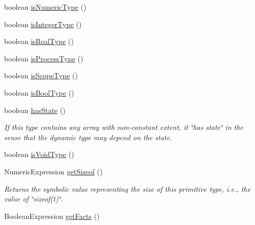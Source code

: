 \begin{DoxyCompactItemize}
\item 
boolean \hyperlink{classedu_1_1udel_1_1cis_1_1vsl_1_1civl_1_1model_1_1common_1_1type_1_1CommonPrimitiveType_af2cb7347dd3cf97e2755e6c57c1ee3f0}{is\+Numeric\+Type} ()
\item 
boolean \hyperlink{classedu_1_1udel_1_1cis_1_1vsl_1_1civl_1_1model_1_1common_1_1type_1_1CommonPrimitiveType_a616c434e123ed87de6d4ce8bc0e1ea56}{is\+Integer\+Type} ()
\item 
boolean \hyperlink{classedu_1_1udel_1_1cis_1_1vsl_1_1civl_1_1model_1_1common_1_1type_1_1CommonPrimitiveType_abc3c30955ff1b4be29eb70bc3bfa40e0}{is\+Real\+Type} ()
\item 
boolean \hyperlink{classedu_1_1udel_1_1cis_1_1vsl_1_1civl_1_1model_1_1common_1_1type_1_1CommonPrimitiveType_abf7588006be760125cbf47a17ef564ea}{is\+Process\+Type} ()
\item 
boolean \hyperlink{classedu_1_1udel_1_1cis_1_1vsl_1_1civl_1_1model_1_1common_1_1type_1_1CommonPrimitiveType_a98006390e062760c91762ce74c54b518}{is\+Scope\+Type} ()
\item 
boolean \hyperlink{classedu_1_1udel_1_1cis_1_1vsl_1_1civl_1_1model_1_1common_1_1type_1_1CommonPrimitiveType_a908c52a47d66a4069a3e6dfb07dc073e}{is\+Bool\+Type} ()
\item 
boolean \hyperlink{classedu_1_1udel_1_1cis_1_1vsl_1_1civl_1_1model_1_1common_1_1type_1_1CommonPrimitiveType_a461014de970101d826e054920c5eceb3}{has\+State} ()
\begin{DoxyCompactList}\small\item\em If this type contains any array with non-\/constant extent, it \char`\"{}has state\char`\"{} in the sense that the dynamic type may depend on the state. \end{DoxyCompactList}\item 
boolean \hyperlink{classedu_1_1udel_1_1cis_1_1vsl_1_1civl_1_1model_1_1common_1_1type_1_1CommonPrimitiveType_a0b36d9b96579ea1272bc495c8ebae390}{is\+Void\+Type} ()
\item 
Numeric\+Expression \hyperlink{classedu_1_1udel_1_1cis_1_1vsl_1_1civl_1_1model_1_1common_1_1type_1_1CommonPrimitiveType_a6fdc74681ebce22982b7a022883c9c85}{get\+Sizeof} ()
\begin{DoxyCompactList}\small\item\em Returns the symbolic value representing the size of this primitive type, i.\+e., the value of \char`\"{}sizeof(t)\char`\"{}. \end{DoxyCompactList}\item 
Boolean\+Expression \hyperlink{classedu_1_1udel_1_1cis_1_1vsl_1_1civl_1_1model_1_1common_1_1type_1_1CommonPrimitiveType_a4238c6dc7edd88a874d60ccdeb3e350b}{get\+Facts} ()

\end{DoxyCompactItemize}
